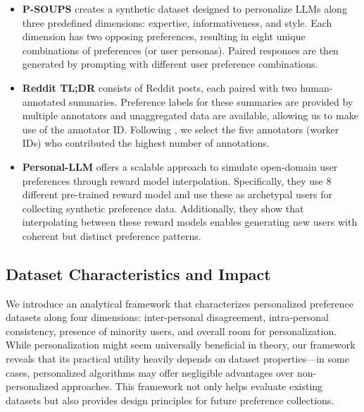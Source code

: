 \begin{itemize}[leftmargin=*, noitemsep,topsep=1pt]
    \itemsep 0em
    \item \textbf{P-SOUPS} \cite{jang_personalized_2023} creates a synthetic dataset designed to personalize LLMs along three predefined dimensions: expertise, informativeness, and style. Each dimension has two opposing preferences, resulting in eight unique combinations of preferences (or user personas). Paired responses are then generated by prompting with different user preference combinations.

    \item \textbf{Reddit TL;DR} \cite{stiennon_learning_2022} consists of Reddit posts, each paired with two human-annotated summaries. Preference labels for these summaries are provided by multiple annotators and unaggregated data are available, allowing us to make use of the annotator ID. Following \citet{park_principled_2024}, we select the five annotators (worker IDs) who contributed the highest number of annotations.

    \item \textbf{Personal-LLM} \cite{zollo_personalllm_2024} offers a scalable approach to simulate open-domain user preferences through reward model interpolation. Specifically, they use 8 different pre-trained reward model and use these as archetypal users for collecting synthetic preference data. Additionally, they show that interpolating between these reward models enables generating new users with coherent but distinct preference patterns. 
    \end{itemize}

\subsection{Dataset Characteristics and Impact} 
\label{subsection: property}

We introduce an analytical framework that characterizes personalized preference datasets along four dimensions: inter-personal disagreement, intra-personal consistency, presence of minority users, and overall room for personalization. While personalization might seem universally beneficial in theory, our framework reveals that its practical utility heavily depends on dataset properties—in some cases, personalized algorithms may offer negligible advantages over non-personalized approaches. This framework not only helps evaluate existing datasets but also provides design principles for future preference collections.

